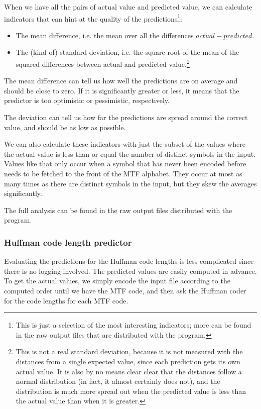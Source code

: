 \documentclass[a4paper]{scrreprt}
\begin{document}
When we have all the pairs of actual value and predicted value, we can calculate
indicators that can hint at the quality of the predictions\footnote{This is
just a selection of the most interesting indicators; more can be found in the
raw output files that are distributed with the program.}:
\begin{itemize}
  \item The mean difference, i.e. the mean over all the differences \(actual -
  predicted\).
  \item The (kind of) standard deviation, i.e. the square root of the mean of
  the squared differences between actual and predicted value.\footnote{This is
  not a real standard deviation, because it is not measured with the distances
  from a single expected value, since each prediction gets its own actual 
  value. It is also by no means clear clear that the distances follow a normal
  distribution (in fact, it almost certainly does not), and the distribution is
  much more spread out when the predicted value is less than the actual value
  than when it is greater.}
\end{itemize}

The mean difference can tell us how well the predictions are on average and
should be close to zero. If it is significantly greater or less, it means that
the predictor is too optimistic or pessimistic, respectively.

The deviation can tell us how far the predictions are spread around the correct
value, and should be as low as possible.

We can also calculate these indicators with just the subset of the values where
the actual value is less than or equal the number of distinct symbols in the
input. Values like that only occur when a symbol that has never been encoded
before needs to be fetched to the front of the MTF alphabet. They occur at most
as many times as there are distinct symbols in the input, but they skew the
averages significantly.

The full analysis can be found in the raw output files distributed with the
program.

\subsubsection{Huffman code length predictor}

Evaluating the predictions for the Huffman code lengths is less complicated
since there is no logging involved. The predicted values are easily computed in
advance. To get the actual values, we simply encode the input file according to
the computed order until we have the MTF code, and then ask the Huffman coder
for the code lengths for each MTF code.
\end{document}
